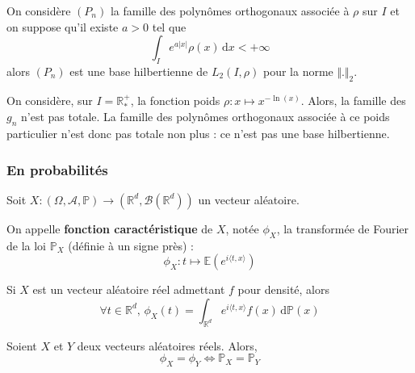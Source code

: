 
  \begin{application}
    On considère $(P_n)$ la famille des polynômes orthogonaux associée à $\rho$ sur $I$ et on suppose qu'il existe $a > 0$ tel que
    \[ \int_I e^{a \vert x \vert} \rho(x) \, \mathrm{d}x < +\infty \]
    alors $(P_n)$ est une base hilbertienne de $L_2(I, \rho)$ pour la norme $\Vert . \Vert_2$.
  \end{application}

  \begin{cexample}
    On considère, sur $I = \mathbb{R}^+_*$, la fonction poids $\rho : x \mapsto x^{-\ln(x)}$. Alors, la famille des $g_n$ n'est pas totale. La famille des polynômes orthogonaux associée à ce poids particulier n'est donc pas totale non plus : ce n'est pas une base hilbertienne.
  \end{cexample}

  \subsubsection{En probabilités}


  Soit $X : (\Omega, \mathcal{A}, \mathbb{P}) \rightarrow (\mathbb{R}^d, \mathcal{B}(\mathbb{R}^d))$ un vecteur aléatoire.

  \begin{definition}
    On appelle \textbf{fonction caractéristique} de $X$, notée $\phi_X$, la transformée de Fourier de la loi $\mathbb{P}_X$ (définie à un signe près) :
    \[ \phi_X : t \mapsto \mathbb{E}(e^{i \langle t, x \rangle}) \]
  \end{definition}


  \begin{remark}
    Si $X$ est un vecteur aléatoire réel admettant $f$ pour densité, alors
    \[ \forall t \in \mathbb{R}^d, \, \phi_X(t) = \int_{\mathbb{R}^d} e^{i \langle t, x \rangle} f(x) \, \mathrm{d}\mathbb{P}(x) \]
  \end{remark}


  \begin{theorem}
    Soient $X$ et $Y$ deux vecteurs aléatoires réels. Alors,
    \[ \phi_X = \phi_Y \iff \mathbb{P}_X = \mathbb{P}_Y \]
  \end{theorem}

